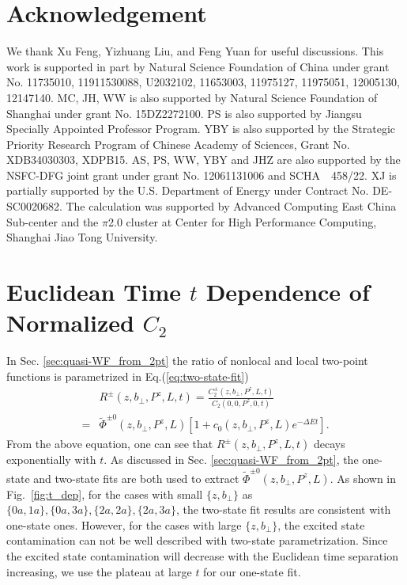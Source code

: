 \section*{Acknowledgement}
We thank Xu Feng, Yizhuang Liu, and Feng Yuan for useful discussions.  This work is supported in part by Natural Science Foundation of China under grant No. 11735010, 11911530088, U2032102, 11653003, 11975127, 11975051, 12005130, 12147140. MC, JH, WW is also supported  by Natural Science Foundation of Shanghai under grant No. 15DZ2272100.  PS is also supported by Jiangsu Specially Appointed Professor Program. YBY is also supported by the Strategic Priority Research Program of Chinese Academy of Sciences, Grant No. XDB34030303, XDPB15. AS, PS, WW, YBY and JHZ are also supported by the NSFC-DFG joint grant under grant No. 12061131006 and SCHA~~458/22. XJ is partially supported by the U.S. Department of Energy under Contract No. DE-SC0020682. The calculation was supported by Advanced Computing East China Sub-center and the $\pi$2.0 cluster at Center for High Performance Computing, Shanghai Jiao Tong University.

\appendix

\section{Euclidean Time $t$ Dependence of Normalized $C_2$}
\label{appsec:C2}


In Sec. \ref{sec:quasi-WF_from_2pt} the ratio of nonlocal and local  two-point functions is parametrized in Eq.(\ref{eq:two-state-fit})
\begin{align}
&R^{\pm}\left(z,b_{\perp},P^z,L,t \right)=\frac{C_2^{\pm}\left(z,b_{\perp},P^z,L,t \right)}{C_2\left(0,0,P^z,0,t \right)} \nonumber\\
=&\tilde{\Phi}^{\pm0}\left(z,b_{\perp},P^z,L\right)\left[1+c_0\left(z,b_{\perp},P^z,L\right)e^{-\Delta Et} \right].
\end{align}
From the above equation, one can see that $R^{\pm}\left(z,b_{\perp},P^z,L,t \right)$ decays exponentially with $t$. As discussed in Sec. \ref{sec:quasi-WF_from_2pt}, the one-state and two-state fits are both used to extract $\tilde{\Phi}^{\pm0}\left(z,b_{\perp},P^z,L\right)$. As shown in Fig.~\ref{fig:t_dep}, for the cases with small $\{z,b_\perp\}$  as $\{0a,1a\},\{0a,3a\},\{2a,2a\},\{2a,3a\}$, the two-state fit results are consistent with one-state ones. However, for the cases with large $\{z, b_\perp\}$, the excited state contamination can not be well described with two-state parametrization. Since the excited state contamination will decrease with the Euclidean time separation increasing, we use the plateau at large $t$ for our one-state fit.

